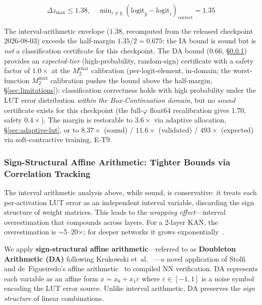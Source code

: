 \documentclass[journal,onecolumn]{IEEEtran}
\begin{document}
\begin{equation}
\Delta z_{\max} \leq 1.38, \quad \min\nolimits_{i \neq \hat{y}}
(\text{logit}_{\hat{y}} - \text{logit}_i)_{\text{correct}} = 1.35
\label{eq:margin_guarantee}
\end{equation}

The interval-arithmetic envelope ($1.38$, recomputed from the released
checkpoint 2026-08-03) exceeds the half-margin $1.35/2 = 0.675$: the IA
bound is sound but is \emph{not} a classification certificate for this
checkpoint. The DA bound ($0.66$, {\S}\ref{sec:da}) provides an
\emph{expected-tier} (high-probability, random-sign) certificate with a
safety factor of $1.0\times$ at the $M_2^{\text{char}}$ calibration
(per-logit-element, in-domain; the worst-function $M_2^{\max}$
calibration pushes the bound above the half-margin,
{\S}\ref{sec:limitations}): classification correctness holds with
high probability under the LUT error distribution \emph{within the
Box-Continuation domain}, but no \emph{sound} certificate exists for
this checkpoint (the full-$\varphi$ float64 recalibration gives $1.70$,
safety $0.4\times$). The margin is restorable to $3.6\times$ via
adaptive allocation, {\S}\ref{sec:adaptive-lut}, or to $8.37\times$
(sound) / $11.6\times$ (validated) / $493\times$ (expected) via
soft-contractive training, E-T9.

\subsubsection{Sign-Structural Affine Arithmetic: Tighter Bounds via Correlation Tracking}
\label{sec:da}

The interval arithmetic analysis above, while sound, is conservative:
it treats each per-activation LUT error as an independent interval variable,
discarding the sign structure of weight matrices. This leads to the
\textit{wrapping effect}---interval overestimation that compounds across
layers. For a 2-layer KAN, the overestimation is $\sim$5--20$\times$;
for deeper networks it grows exponentially~\cite{krukowski2024doubleton}.

We apply \textbf{sign-structural affine arithmetic}---referred to as
\textbf{Doubleton Arithmetic (DA)} following Krukowski et~al.%
~\cite{krukowski2024doubleton}---a novel application of Stolfi and
de~Figueiredo's affine arithmetic~\cite{stolfi2003affine} to compiled
NN verification. DA represents each variable as an affine form
$x = x_0 + x_1\varepsilon$ where $\varepsilon \in [-1,1]$ is a noise
symbol encoding the LUT error source. Unlike interval arithmetic,
DA preserves the \textit{sign structure} of linear combinations.
\end{document}
